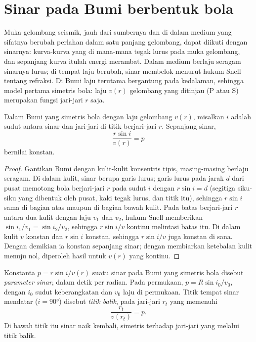 \section{Sinar pada Bumi berbentuk bola}

Muka gelombang seismik, jauh dari sumbernya dan di dalam medium yang sifatnya
berubah perlahan dalam satu panjang gelombang, dapat diikuti dengan sinarnya: kurva-kurva
yang di mana-mana tegak lurus pada muka gelombang, dan sepanjang kurva itulah energi merambat. Dalam
medium berlaju seragam sinarnya lurus; di tempat laju berubah, sinar
membelok menurut hukum Snell tentang refraksi. Di Bumi laju terutama bergantung pada
kedalaman, sehingga model pertama simetris bola: laju $v(r)$ gelombang
yang ditinjau (P atau S) merupakan fungsi jari-jari $r$ saja.

\begin{theorem}\label{thm:b3:seismology-imaging:snell}
Dalam Bumi yang simetris bola dengan laju gelombang $v(r)$, misalkan $i$ adalah sudut
antara sinar dan jari-jari di titik berjari-jari $r$. Sepanjang sinar,
\[
  \frac{r\sin i}{v(r)} = p
\]
bernilai konstan.
\end{theorem}

\begin{proof}
Gantikan Bumi dengan kulit-kulit konsentris tipis, masing-masing berlaju seragam. Di dalam
kulit, sinar berupa garis lurus; garis lurus pada jarak $d$ dari
pusat memotong bola berjari-jari $r$ pada sudut $i$ dengan
$r\sin i = d$ (segitiga siku-siku yang dibentuk oleh pusat, kaki tegak lurus, dan
titik itu), sehingga $r\sin i$ sama di bagian atas maupun di
bagian bawah kulit. Pada batas berjari-jari $r$ antara dua kulit dengan laju
$v_1$ dan $v_2$, hukum Snell memberikan $\sin i_1/v_1 = \sin i_2/v_2$, sehingga
$r\sin i/v$ kontinu melintasi batas itu. Di dalam kulit $v$ konstan dan
$r\sin i$ konstan, sehingga $r\sin i/v$ juga konstan di sana. Dengan demikian
ia konstan sepanjang sinar; dengan membiarkan ketebalan kulit menuju
nol, diperoleh hasil untuk $v(r)$ yang kontinu.
\end{proof}

\begin{definition}\label{def:b3:seismology-imaging:ray-parameter}
Konstanta $p = r\sin i/v(r)$ suatu sinar pada Bumi yang simetris bola disebut
\emph{parameter sinar}, dalam detik per radian. Pada
permukaan, $p = R\sin i_0/v_0$, dengan $i_0$ sudut keberangkatan dan $v_0$
laju di permukaan. Titik tempat sinar mendatar ($i = \ang{90}$)
disebut \emph{titik balik},
pada jari-jari $r_t$ yang memenuhi
\[
  \frac{r_t}{v(r_t)} = p .
\]
Di bawah titik itu sinar naik kembali, simetris terhadap jari-jari yang melalui
titik balik.
\end{definition}

